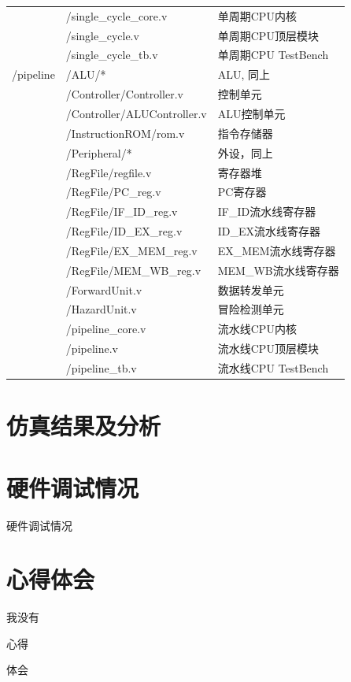 \documentclass{article}
\begin{document}
\begin{longtable}{l|ll}
                & /single\_cycle\_core.v & 单周期CPU内核 \\
                & /single\_cycle.v & 单周期CPU顶层模块 \\
                & /single\_cycle\_tb.v & 单周期CPU TestBench \\
                \midrule
                /pipeline & /ALU/* & ALU, 同上 \\
                & /Controller/Controller.v & 控制单元 \\
                & /Controller/ALUController.v & ALU控制单元 \\
                & /InstructionROM/rom.v & 指令存储器 \\
                & /Peripheral/* & 外设，同上 \\
                & /RegFile/regfile.v & 寄存器堆 \\
                & /RegFile/PC\_reg.v & PC寄存器 \\
                & /RegFile/IF\_ID\_reg.v & IF\_ID流水线寄存器 \\
                & /RegFile/ID\_EX\_reg.v & ID\_EX流水线寄存器 \\
                & /RegFile/EX\_MEM\_reg.v & EX\_MEM流水线寄存器 \\
                & /RegFile/MEM\_WB\_reg.v & MEM\_WB流水线寄存器 \\
                & /ForwardUnit.v & 数据转发单元 \\
                & /HazardUnit.v & 冒险检测单元 \\
                & /pipeline\_core.v & 流水线CPU内核 \\
                & /pipeline.v & 流水线CPU顶层模块 \\
                & /pipeline\_tb.v & 流水线CPU TestBench \\
            \end{longtable}

    \section{仿真结果及分析}

    \section{硬件调试情况}
        硬件调试情况

    \section{心得体会}

        \begin{enumerate}
            \begin{item}
                我没有
            \end{item}
            \begin{item}
                心得
            \end{item}
            \begin{item}
                体会
            \end{item}
        \end{enumerate}
\end{document}
